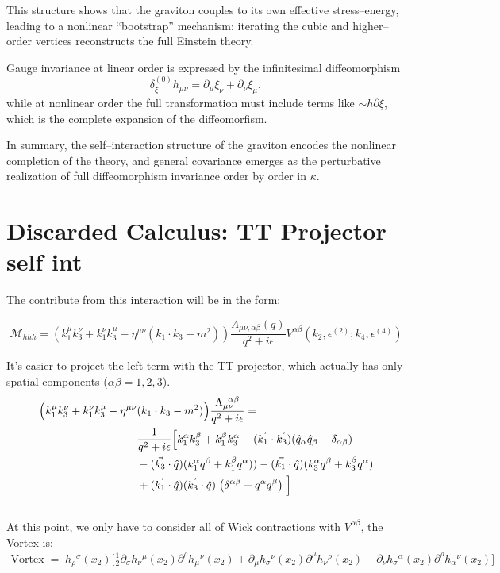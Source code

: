 \documentclass[12pt,a4paper,oneside]{article}
\numberwithin{equation}{section}   %
\begin{document}
This structure shows that the graviton couples to its own effective stress–energy, 
leading to a nonlinear “bootstrap” mechanism: iterating the cubic and higher–order 
vertices reconstructs the full Einstein theory.

Gauge invariance at linear order is expressed by the infinitesimal diffeomorphism
\begin{equation}
\delta_\xi^{(0)} h_{\mu\nu}
= \partial_\mu \xi_\nu + \partial_\nu \xi_\mu,
\end{equation}
while at nonlinear order the full transformation must include terms like $\sim h \partial \xi$, which is the complete expansion of the diffeomorfism.

In summary, the self–interaction structure of the graviton encodes the nonlinear 
completion of the theory, and general covariance emerges as the perturbative 
realization of full diffeomorphism invariance order by order in \(\kappa\).


\section{Discarded Calculus: TT Projector self int}
The contribute from this interaction will be in the form:

\[ 
\mathcal M_{hhh}=\left(k_1^\mu k_3^\nu+k_1^\nu k_3^\mu-\eta^{\mu\nu}(k_1 \cdot k_3-m^2)\right)\frac{\Lambda_{\mu\nu,\alpha\beta}(q)}{q^2+i\epsilon}V^{\alpha\beta}(k_2,\epsilon^{(2)};k_4,\epsilon^{(4)})
\]

It's easier to project the left term with the TT projector, which actually has only spatial components ($\alpha\beta=1,2,3$).
\begin{align}
    \Bigl(k_1^\mu k_3^\nu + k_1^\nu  k_3^\mu-\eta^{\mu\nu}&(k_1 \cdot k_3-m^2)\Bigr)\frac{\Lambda_{\mu\nu}^{\;\;\alpha\beta}}{q^2+i\epsilon} = \\&
    \frac{1}{q^2+i\epsilon}\Bigl[
        k_1^\alpha k_3^\beta +k_1^\beta k_3^\alpha - (\vec{k_1}\cdot \vec{k_3})(\hat{q}_\alpha\hat{q}_\beta-\delta_{\alpha\beta})\\& -(\vec{k_3}\cdot \hat{q})(k_1^\alpha q^\beta+k_1^\beta q^\alpha)) - (\vec{k_1}\cdot \hat{q})(k_3^\alpha q^\beta+k_3^\beta q^\alpha)\\&
        +(\vec{k_1}\cdot\hat{q})(\vec{k_3}\cdot\hat{q})\;\bigl(\delta^{\alpha\beta}+q^\alpha q^\beta\bigr) \;
    \Bigr]
\end{align}\\
At this point, we only have to consider all of Wick contractions with $V^{\alpha\beta}$, the Vortex is:
\begin{align}
\text{Vortex} \; = \;h_{\rho}{}^{\sigma}(x_2)
\Bigg[
\frac12
\partial_{\sigma}h_{\nu}{}^{\mu}(x_2)
\partial^{\rho}h_{\mu}{}^{\nu}(x_2)
+
\partial_{\mu}h_{\sigma}{}^{\nu}(x_2)
\partial^{\mu}h_{\nu}{}^{\rho}(x_2)
-
\partial_{\nu}h_{\sigma}{}^{\alpha}(x_2)
\partial^{\rho}h_{\alpha}{}^{\nu}(x_2)
\Bigg]
\end{align}
\end{document}
